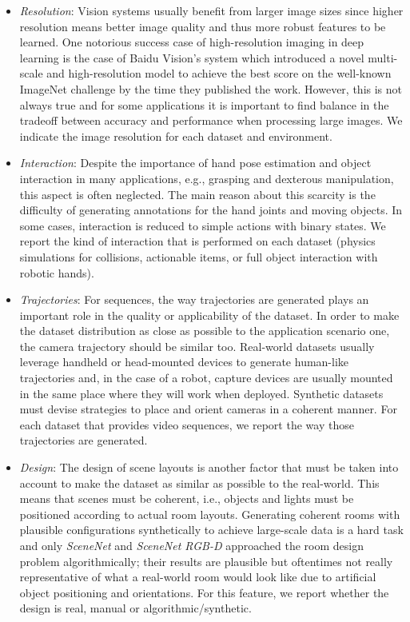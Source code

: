 \begin{itemize}
  \item \emph{Resolution}: Vision systems usually benefit from larger image sizes since higher resolution means better image quality and thus more robust features to be learned. One notorious success case of high-resolution imaging in deep learning is the case of Baidu Vision's system \cite{Wu2015b} which introduced a novel multi-scale and high-resolution model to achieve the best score on the well-known ImageNet challenge \cite{Russakovsky2015} by the time they published the work. However, this is not always true and for some applications it is important to find balance in the tradeoff between accuracy and performance when processing large images. We indicate the image resolution for each dataset and environment.
  \item \emph{Interaction}: Despite the importance of hand pose estimation and object interaction in many applications, e.g., grasping and dexterous manipulation, this aspect is often neglected. The main reason about this scarcity is the difficulty of generating annotations for the hand joints and moving objects. In some cases, interaction is reduced to simple actions with binary states. We report the kind of interaction that is performed on each dataset (physics simulations for collisions, actionable items, or full object interaction with robotic hands).
  \item \emph{Trajectories}: For sequences, the way trajectories are generated plays an important role in the quality or applicability of the dataset. In order to make the dataset distribution as close as possible to the application scenario one, the camera trajectory should be similar too. Real-world datasets usually leverage handheld or head-mounted devices to generate human-like trajectories and, in the case of a robot, capture devices are usually mounted in the same place where they will work when deployed. Synthetic datasets must devise strategies to place and orient cameras in a coherent manner. For each dataset that provides video sequences, we report the way those trajectories are generated.
  \item \emph{Design}: The design of scene layouts is another factor that must be taken into account to make the dataset as similar as possible to the real-world. This means that scenes must be coherent, i.e., objects and lights must be positioned according to actual room layouts. Generating coherent rooms with plausible configurations synthetically to achieve large-scale data is a hard task and only \emph{SceneNet}\cite{Handa2015} and \emph{SceneNet RGB-D}\cite{McCormac2017} approached the room design problem algorithmically; their results are plausible but oftentimes not really representative of what a real-world room would look like due to artificial object positioning and orientations. For this feature, we report whether the design is real, manual or algorithmic/synthetic.
\end{itemize}

